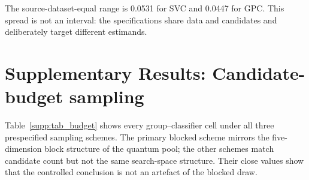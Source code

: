 \documentclass[11pt]{article}
\begin{document}
The source-dataset-equal range is 0.0531 for SVC and 0.0447 for GPC.
This spread is not an interval: the specifications share data and candidates
and deliberately target different estimands.

\section*{Supplementary Results: Candidate-budget sampling}
\label{supp:budget}

Table~\ref{supp:tab_budget} shows every group--classifier cell under all three
prespecified sampling schemes. The primary blocked scheme mirrors the
five-dimension block structure of the quantum pool; the other schemes match
candidate count but not the same search-space structure. Their close values
show that the controlled conclusion is not an artefact of the blocked draw.
\end{document}
